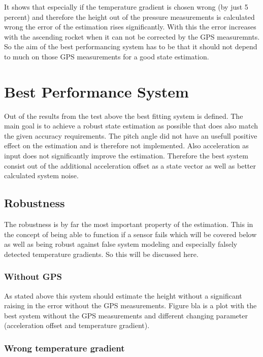 It shows that especially if the temperature gradient is chosen wrong (by just 5 percent) and
therefore the height out of the pressure measurements is calculated wrong the error of the estimation rises significantly.
With this the error increases with the ascending rocket when it can not be corrected by the GPS measuremnts.
So the aim of the best performancing system has to be that it should not depend to much on those GPS measurements for a good state estimation.

\newpage
\section{Best Performance System}
Out of the results from the test above the best fitting system is defined.
The main goal is to achieve a robust state estimation as possible that does also match the given accuracy requirements.
The pitch angle did not have an usefull positive effect on the estimation and is therefore not implemented.
Also acceleration as input does not significantly improve the estimation.
Therefore the best system consist out of the additional acceleration offset as a state vector as well as better calculated system noise.





\subsection{Robustness}
The robustness is by far the most important property of the estimation.
This in the concept of being able to function if a sensor fails which will be covered below as well as being robust against false system modeling 
and especially falsely detected temperature gradients. So this will be discussed here.

\subsubsection{Without GPS}
As stated above this system should estimate the height without a significant raising in the error without the GPS measurements.
Figure bla is a plot with the best system without the GPS measurements and different changing parameter (acceleration offset and temperature gradient).
\subsubsection{Wrong temperature gradient}


